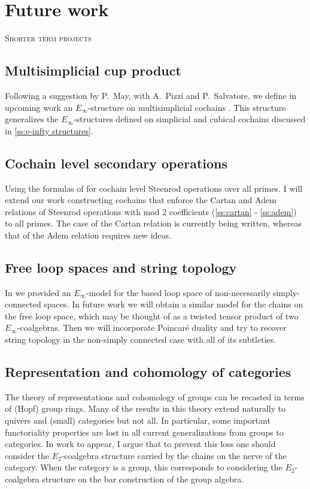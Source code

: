 
\section{Future work}

\noindent \textsc{Shorter term projects}

\subsection{Multisimplicial cup product}

Following a suggestion by P.~May, with A.~Pizzi and P.~Salvatore, we define in upcoming work an $E_\infty$-structure on multisimplicial cochains \cite{medina2021multisimplicial}.
This structure generalizes the $E_\infty$-structures defined on simplicial and cubical cochains discussed in \cref{ss:e-infty structures}.

\subsection{Cochain level secondary operations}

Using the formulas of \cite{medina2021maysteenrod} for cochain level Steenrod operations over all primes.
I will extend our work constructing cochains that enforce the Cartan and Adem relations of Steenrod operations with mod $2$ coefficients (\cref{ss:cartan} - \cref{ss:adem}) to all primes.
The case of the Cartan relation is currently being written, whereas that of the Adem relation requires new ideas.

\subsection{Free loop spaces and string topology}

In \cite{medina2021cobar} we provided an $E_\infty$-model for the based loop space of non-necessarily simply-connected spaces.
In future work we will obtain a similar model for the chains on the free loop space, which may be thought of as a twisted tensor product of two $E_\infty$-coalgebras.
Then we will incorporate Poincar\'{e} duality and try to recover string topology in the non-simply connected case with all of its subtleties.

\subsection{Representation and cohomology of categories}

The theory of representations and cohomology of groups can be recasted in terms of (Hopf) group rings.
Many of the results in this theory extend naturally to quivers and (small) categories but not all.
In particular, some important functoriality properties are lost in all current generalizations from groups to categories.
In work to appear, I argue that to prevent this loss one should consider the $E_2$-coalgebra structure carried by the chains on the nerve of the category.
When the category is a group, this corresponds to considering the $E_2$-coalgebra structure on the bar construction of the group algebra.

